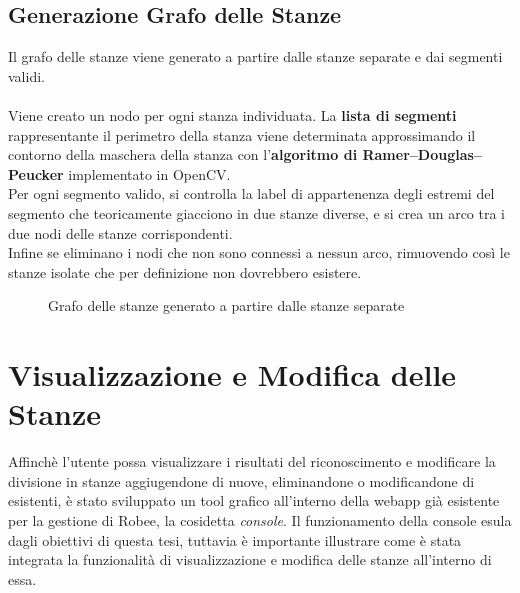 \subsection{Generazione Grafo delle Stanze}
Il grafo delle stanze viene generato a partire dalle stanze separate e dai segmenti validi.\\\\
Viene creato un nodo per ogni stanza individuata. La \textbf{lista di segmenti} rappresentante il perimetro della stanza viene determinata approssimando il contorno della maschera della stanza con l'\textbf{algoritmo di Ramer–Douglas–Peucker} implementato in OpenCV.\\
Per ogni segmento valido, si controlla la label di appartenenza degli estremi del segmento che teoricamente giacciono in due stanze diverse, e si crea un arco tra i due nodi delle stanze corrispondenti. \\
Infine se eliminano i nodi che non sono connessi a nessun arco, rimuovendo così le stanze isolate che per definizione non dovrebbero esistere.
\begin{figure}[H]
  \centering
  \caption{Grafo delle stanze generato a partire dalle stanze separate}
\end{figure}
\section{Visualizzazione e Modifica delle Stanze}
Affinchè l'utente possa visualizzare i risultati del riconoscimento e modificare la divisione in stanze aggiugendone di nuove, eliminandone o modificandone di esistenti, è stato sviluppato un tool grafico all'interno della webapp già esistente per la gestione di Robee, la cosidetta \textit{console}. Il funzionamento della console esula dagli obiettivi di questa tesi, tuttavia è importante illustrare come è stata integrata la funzionalità di visualizzazione e modifica delle stanze all'interno di essa.
